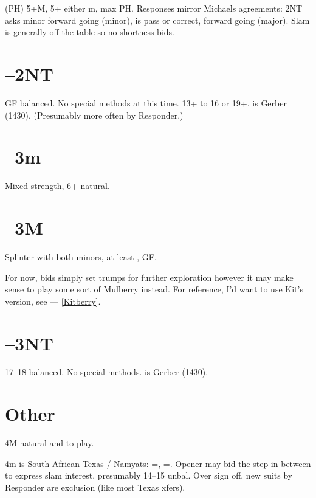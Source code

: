 \documentclass[main]{subfiles}
\begin{document}
	(PH) 5+M, 5+ either m, max PH.  Responses mirror Michaels agreements:  2NT asks minor forward going (minor),  is pass or correct,  forward going (major).  Slam is generally off the table so no shortness bids.
	 
\section[1D--2NT]{--2NT}

GF balanced. No special methods at this time. 13+ to 16 or 19+.   is Gerber (1430).  (Presumably more often by Responder.)

\section[1D--3m]{--3m}

Mixed strength, 6+ natural.

\section[1D--3M]{--3M}

Splinter with both minors, at least , GF.

For now, bids simply set trumps for further exploration however it may make sense to play some sort of Mulberry instead.  For reference, I'd want to use Kit's version, see  --- \ref{Kitberry}.

\section[1D--3NT]{--3NT}

17--18 balanced. No special methods.  is Gerber (1430).

\section{Other}

4M natural and to play.

4m is South African Texas / Namyats:  =\hhh, =\sss.  Opener may bid the step in between to express slam interest, presumably 14--15 unbal.  Over sign off, new suits by Responder are exclusion (like most Texas xfers).   
\end{document}
